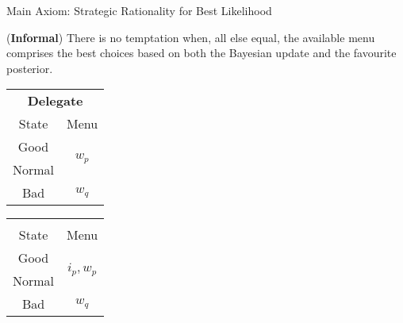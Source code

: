 \documentclass[usenames,dvipsnames,aspectratio=169,11pt, envcountsect, handout]{beamer}
\begin{document}
\begin{frame}{Main Axiom: Strategic Rationality for Best Likelihood}\label{srbl}

	\begin{axiom}\label{ax:srbl} (\textbf{Informal})
		There is no temptation when, all else equal, the available menu comprises the best choices based on both the Bayesian update and the favourite posterior. \: \: \hyperlink{srblapp}{} \pause
	\end{axiom}

	\vfill

	\begin{table}[H]
		\centering
		\begin{minipage}{0.4\textwidth}
			\centering
			\begin{tabular}{c | c}
				\multicolumn{2}{c}{\textbf{Delegate}}                           \\
				State                & Menu                                     \\
				\hline
				{\color{blue}Good}   & \multirow{2}{*}{{\color{blue}\( w_p \)}} \\
				{\color{blue}Normal} &                                          \\
				Bad                  & \( w_q \)                                \\
			\end{tabular}
			\vspace{0.5cm} %
		\end{minipage}%
		\begin{minipage}{0.4\textwidth}
			\centering
			\begin{tabular}{c | c}
				\multicolumn{2}{c}{}                                                 \\
				State                & Menu                                          \\
				\hline
				{\color{blue}Good}   & \multirow{2}{*}{{\color{blue}\( i_p, w_p \)}} \\
				{\color{blue}Normal} &                                               \\
				Bad                  & \( w_q \)                                     \\
			\end{tabular}
			\vspace{0.5cm} %
		\end{minipage} %
	\end{table}

\end{frame}
\end{document}
